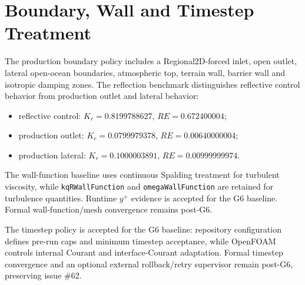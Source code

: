 \section{Boundary, Wall and Timestep Treatment}

The production boundary policy includes a Regional2D-forced inlet, open outlet, lateral open-ocean boundaries, atmospheric top, terrain wall, barrier wall and isotropic damping zones. The reflection benchmark distinguishes reflective control behavior from production outlet and lateral behavior:

\begin{itemize}
  \item reflective control: \(K_r=0.8199788627\), \(RE=0.672400004\);
  \item production outlet: \(K_r=0.0799979378\), \(RE=0.00640000004\);
  \item production lateral: \(K_r=0.1000003891\), \(RE=0.00999999974\).
\end{itemize}

The wall-function baseline uses continuous Spalding treatment for turbulent viscosity, while \texttt{kqRWallFunction} and \texttt{omegaWallFunction} are retained for turbulence quantities. Runtime \(y^+\) evidence is accepted for the G6 baseline. Formal wall-function/mesh convergence remains post-G6.

The timestep policy is accepted for the G6 baseline: repository configuration defines pre-run caps and minimum timestep acceptance, while OpenFOAM controls internal Courant and interface-Courant adaptation. Formal timestep convergence and an optional external rollback/retry supervisor remain post-G6, preserving issue \#62.
